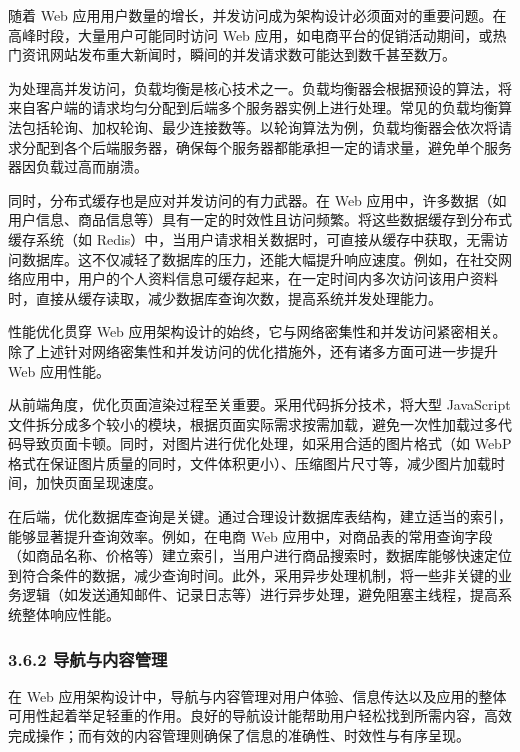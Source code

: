 随着 Web 应用用户数量的增长，并发访问成为架构设计必须面对的重要问题。在高峰时段，大量用户可能同时访问 Web 应用，如电商平台的促销活动期间，或热门资讯网站发布重大新闻时，瞬间的并发请求数可能达到数千甚至数万。

为处理高并发访问，负载均衡是核心技术之一。负载均衡器会根据预设的算法，将来自客户端的请求均匀分配到后端多个服务器实例上进行处理。常见的负载均衡算法包括轮询、加权轮询、最少连接数等。以轮询算法为例，负载均衡器会依次将请求分配到各个后端服务器，确保每个服务器都能承担一定的请求量，避免单个服务器因负载过高而崩溃。

同时，分布式缓存也是应对并发访问的有力武器。在 Web 应用中，许多数据（如用户信息、商品信息等）具有一定的时效性且访问频繁。将这些数据缓存到分布式缓存系统（如 Redis）中，当用户请求相关数据时，可直接从缓存中获取，无需访问数据库。这不仅减轻了数据库的压力，还能大幅提升响应速度。例如，在社交网络应用中，用户的个人资料信息可缓存起来，在一定时间内多次访问该用户资料时，直接从缓存读取，减少数据库查询次数，提高系统并发处理能力。


性能优化贯穿 Web 应用架构设计的始终，它与网络密集性和并发访问紧密相关。除了上述针对网络密集性和并发访问的优化措施外，还有诸多方面可进一步提升 Web 应用性能。

从前端角度，优化页面渲染过程至关重要。采用代码拆分技术，将大型 JavaScript 文件拆分成多个较小的模块，根据页面实际需求按需加载，避免一次性加载过多代码导致页面卡顿。同时，对图片进行优化处理，如采用合适的图片格式（如 WebP 格式在保证图片质量的同时，文件体积更小）、压缩图片尺寸等，减少图片加载时间，加快页面呈现速度。

在后端，优化数据库查询是关键。通过合理设计数据库表结构，建立适当的索引，能够显著提升查询效率。例如，在电商 Web 应用中，对商品表的常用查询字段（如商品名称、价格等）建立索引，当用户进行商品搜索时，数据库能够快速定位到符合条件的数据，减少查询时间。此外，采用异步处理机制，将一些非关键的业务逻辑（如发送通知邮件、记录日志等）进行异步处理，避免阻塞主线程，提高系统整体响应性能。

\hypertarget{ux5bfcux822aux4e0eux5185ux5bb9ux7ba1ux7406}{%
\subsubsection{3.6.2 导航与内容管理}\label{ux5bfcux822aux4e0eux5185ux5bb9ux7ba1ux7406}}

在 Web 应用架构设计中，导航与内容管理对用户体验、信息传达以及应用的整体可用性起着举足轻重的作用。良好的导航设计能帮助用户轻松找到所需内容，高效完成操作；而有效的内容管理则确保了信息的准确性、时效性与有序呈现。

